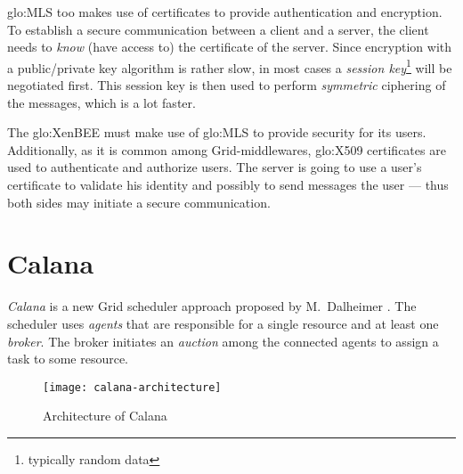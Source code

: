 \gls{glo:MLS} too makes use  of certificates to provide authentication and
encryption. To  establish a  secure communication between  a client  and a
server,  the  client  needs  to  \emph{know}  (\ie have  access  to)  the
certificate  of the server.   Since encryption  with a  public/private key
algorithm   is    rather   slow,    in   most   cases    a   \emph{session
  key}\footnote{typically  random data}  will be  negotiated  first.  This
session  key is  then used  to perform  \emph{symmetric} ciphering  of the
messages, which is a lot faster.

The \gls{glo:XenBEE}  must make use  of \gls{glo:MLS} to  provide security
for  its users.   Additionally, as  it is  common  among Grid-middlewares,
\gls{glo:X509}  certificates  are   used  to  authenticate  and  authorize
users. The  server is going  to use a  user's certificate to  validate his
identity and  possibly to send messages  the user --- thus  both sides may
initiate a secure communication.

\section{Calana}
\label{sec:calana}

\emph{Calana} is  a new Grid  scheduler approach proposed  by M.~Dalheimer
\cite{dalheimer05agentbased}.  The  scheduler uses \emph{agents}  that are
responsible for  a single  resource and at  least one  \emph{broker}.  The
broker initiates an \emph{auction} among  the connected agents to assign a
task to some resource.

\begin{figure}[htbp]
  \centering
  \texttt{[image: calana-architecture]}
  \caption{Architecture of Calana}
  \label{fig:calana-architecture}
\end{figure}

